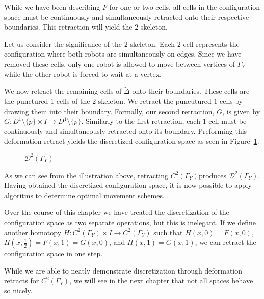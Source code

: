 \documentclass[12pt,oneside]{amsbook}
\newcommand{\Y}{\Gamma_Y}
\newcommand{\C}{$C^2(\Y)$}
\begin{document}
While we have been describing $F$ for one or two cells, all cells in the configuration space must be continuously and simultaneously retracted onto their respective boundaries. This retraction will yield the $2$-skeleton. 

Let us consider the significance of the $2$-skeleton. Each $2$-cell represents the configuration where both robots are simultaneously on edges. Since we have removed these cells, only one robot is allowed to move between vertices of $\Y$ while the other robot is forced to wait at a vertex.

We now retract the remaining cells of $\tilde{\Delta}$ onto their boundaries. These cells are the punctured $1$-cells of the $2$-skeleton. We retract the puncutured $1$-cells by drawing them into their boundary. Formally, our second retraction, $G$, is given by $G\colon D^1\setminus\{p\} \times I \rightarrow D^1\setminus\{p\} $. Similarly to the first retraction, each $1$-cell must be continuously and simultaneously retracted onto its boundary. Preforming this deformation retract yields the discretized configuration space as seen in Figure~\ref{fig:disc}.


\begin{figure}[h]
\caption{$\mathcal{D}^2(\Y)$}\label{fig:disc}
\centering
\end{figure}

As we can see from the illustration above, retracting \C produces $\mathcal{D}^2(\Y)$. Having obtained the discretized configuration space, it is now possible to apply algoritms to determine optimal movement schemes.

Over the course of this chapter we have treated the discretization of the configuration space as two separate operations, but this is inelegant. If we define another homotopy $H\colon C^2(\Y)\times I \rightarrow C^2(\Y)$ such that $H(x,0)=F(x,0)$, $H(x,\frac{1}{2}) = F(x,1) = G(x,0)$, and $H(x,1)=G(x,1)$, we can retract the configuration space in one step.

While we are able to neatly demonstrate discretization through deformation retracts for $C^2(\Y)$, we will see in the next chapter that not all spaces behave so nicely.
\end{document}
